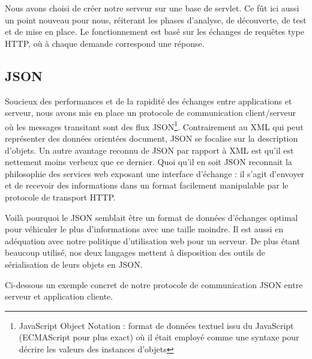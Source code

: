 Nous avons choisi de créer notre serveur sur une base de servlet. Ce fût ici
aussi un point nouveau pour nous, réiterant les phases d'analyse, de
découverte, de test et de mise en place. Le fonctionnement est basé sur les
échanges de requêtes type HTTP, où à chaque demande correspond une réponse. 

		
\subsection{JSON}
	Soucieux des performances et de la rapidité des échanges entre applications et
	serveur, nous avons mis en place un protocole de communication client/serveur
	où les messages transitant sont des flux JSON\footnote{JavaScript Object
	Notation :  format de données textuel issu du JavaScript (ECMAScript pour plus
	exact) où il était employé comme une syntaxe pour décrire les valeurs des
	instances d’objets}. 	
	Contrairement au XML qui peut représenter des données orientées document,
	JSON se focalise sur la description d’objets.
	Un autre avantage reconnu de JSON par rapport à XML est qu’il est nettement
	moins verbeux que ce dernier.
	Quoi qu’il en soit JSON reconnait la philosophie des services web exposant
	une interface d’échange : il s’agit
	d’envoyer et de recevoir des informations dans un format facilement manipulable par
	le protocole de transport HTTP.
	
	
	Voilà pourquoi le JSON semblait être un format de données d'échanges optimal
	pour véhiculer le plus d'informations avec une taille moindre. Il est aussi en
	adéquation avec notre politique d'utilisation web pour un serveur.
	De plus étant beaucoup utilisé, nos deux
	langages mettent à disposition des outils de sérialisation de leurs objets en JSON.
	
	Ci-dessous un exemple concret de notre protocole de communication JSON entre
	serveur et application cliente.
	
